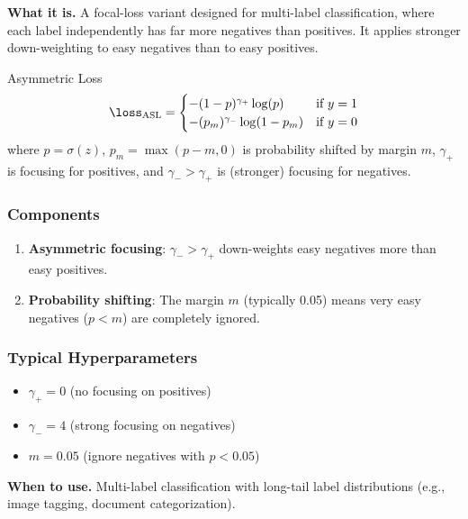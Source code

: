 \textbf{What it is.} A focal-loss variant designed for multi-label classification, where each label independently has far more negatives than positives. It applies stronger down-weighting to easy negatives than to easy positives.

\begin{mathresult}{Asymmetric Loss}
\begin{equation}
\loss_{\text{ASL}} = \begin{cases}
-(1-p)^{\gamma_+} \log(p) & \text{if } y = 1 \\
-(p_m)^{\gamma_-} \log(1-p_m) & \text{if } y = 0
\end{cases}
\end{equation}
where $p = \sigma(z)$, $p_m = \max(p - m, 0)$ is probability shifted by margin $m$, $\gamma_+$ is focusing for positives, and $\gamma_- > \gamma_+$ is (stronger) focusing for negatives.
\end{mathresult}

\subsubsection{Components}

\begin{enumerate}
    \item \textbf{Asymmetric focusing}: $\gamma_- > \gamma_+$ down-weights easy negatives more than easy positives.

    \item \textbf{Probability shifting}: The margin $m$ (typically 0.05) means very easy negatives ($p < m$) are completely ignored.
\end{enumerate}

\subsubsection{Typical Hyperparameters}

\begin{itemize}
    \item $\gamma_+ = 0$ (no focusing on positives)
    \item $\gamma_- = 4$ (strong focusing on negatives)
    \item $m = 0.05$ (ignore negatives with $p < 0.05$)
\end{itemize}

\textbf{When to use.} Multi-label classification with long-tail label distributions (e.g., image tagging, document categorization).

